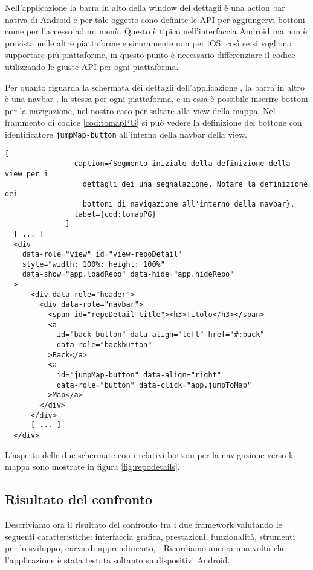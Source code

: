             Nell'applicazione \tisdk{} la barra in alto della window dei
            dettagli è una action bar nativa di Android e per tale oggetto sono
            definite le API per aggiungervi bottoni come per l'accesso ad un
            menù. Questo è tipico nell'interfaccia Android ma non è prevista
            nelle altre piattaforme e sicuramente non per iOS; così se si
            vogliono supportare più piattaforme, in questo punto è necessario
            differenziare il codice utilizzando le giuste API per ogni
            piattaforma.

            Per quanto riguarda la schermata dei dettagli dell'applicazione
            \pg{}, la barra in altro è una navbar \kendomob{}, la stessa per
            ogni piattaforma, e in essa è possibile inserire bottoni per la
            navigazione, nel nostro caso per saltare alla view della mappa. Nel
            frammento di codice \ref{cod:tomapPG} si può vedere la definizione
            del bottone con identificatore \texttt{jumpMap-button} all'interno
            della navbar della view.
            \begin{lstlisting}[
                caption={Segmento iniziale della definizione della view per i
                  dettagli dei una segnalazione. Notare la definizione dei
                  bottoni di navigazione all'interno della navbar},
                label={cod:tomapPG}
              ]
  [ ... ]
  <div
    data-role="view" id="view-repoDetail"
    style="width: 100%; height: 100%"
    data-show="app.loadRepo" data-hide="app.hideRepo"
  >
      <div data-role="header">
        <div data-role="navbar">
          <span id="repoDetail-title"><h3>Titolo</h3></span>
          <a
            id="back-button" data-align="left" href="#:back"
            data-role="backbutton"
          >Back</a>
          <a
            id="jumpMap-button" data-align="right"
            data-role="button" data-click="app.jumpToMap"
          >Map</a>
        </div>
      </div>
      [ ... ]
  </div>
            \end{lstlisting}

            L'aspetto delle due schermate con i relativi bottoni per la
            navigazione verso la mappa sono mostrate in figura
            \ref{fig:repodetails}.

    \subsection{Risultato del confronto}
    Descriviamo ora il risultato del confronto tra i due framework valutando
    le seguenti caratteristiche: interfaccia grafica, prestazioni,
    funzionalità, strumenti per lo sviluppo, curva di apprendimento,
    \crossplat{}. Ricordiamo ancora una
    volta che l'applicazione è stata testata soltanto su dispositivi Android.
